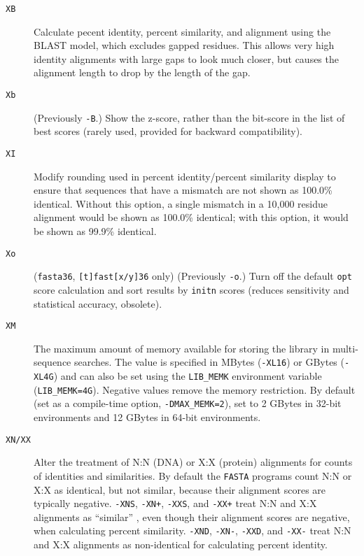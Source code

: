 \documentclass[11pt]{article}
\begin{document}
\begin{description}
\begin{description}
\item[\texttt{XB}] Calculate pecent identity, percent similarity, and
  alignment using the BLAST model, which excludes gapped residues.
  This allows very high identity alignments with large gaps to look
  much closer, but causes the alignment length to drop by the length
  of the gap.

\item[\texttt{Xb}] (Previously \texttt{-B}.)  Show the z-score, rather
  than the bit-score in the list of best scores (rarely used, provided
  for backward compatibility).

\item[\texttt{XI}] Modify rounding used in percent identity/percent
  similarity display to ensure that sequences that have a mismatch are
  not shown as 100.0\% identical.  Without this option, a single
  mismatch in a 10,000 residue alignment would be shown as 100.0\%
  identical; with this option, it would be shown as 99.9\%
  identical.

\item[\texttt{Xo}] (\texttt{fasta36}, \texttt{[t]fast[x/y]36} only)
  (Previously \texttt{-o}.) Turn off the default \texttt{opt} score
  calculation and sort results by \texttt{initn} scores (reduces
  sensitivity and statistical accuracy, obsolete).

\item[\texttt{XM}] The maximum amount of memory available for storing
  the library in multi-sequence searches. The value is specified in
  MBytes (\texttt{-XL16}) or GBytes (\texttt{-XL4G}) and can also be
  set using the \texttt{LIB\_MEMK} environment variable
  (\texttt{LIB\_MEMK=4G}).  Negative values remove the memory
  restriction. By default (set as a compile-time option,
  \texttt{-DMAX\_MEMK=2}), set to 2 GBytes in 32-bit environments and
  12 GBytes in 64-bit environments.

\item[\texttt{XN/XX}] Alter the treatment of N:N (DNA) or X:X
  (protein) alignments for counts of identities and similarities. By
  default the \texttt{FASTA} programs count N:N or X:X as identical,
  but not similar, because their alignment scores are typically
  negative. \texttt{-XNS}, \texttt{-XN+}, \texttt{-XXS}, and
  \texttt{-XX+} treat N:N and X:X alignments as ``similar'' , even
  though their alignment scores are negative, when calculating percent
  similarity. \texttt{-XND}, \texttt{-XN-}, \texttt{-XXD}, and
  \texttt{-XX-} treat N:N and X:X alignments as non-identical for
  calculating percent identity.


\end{description}
\end{description}
\end{document}
